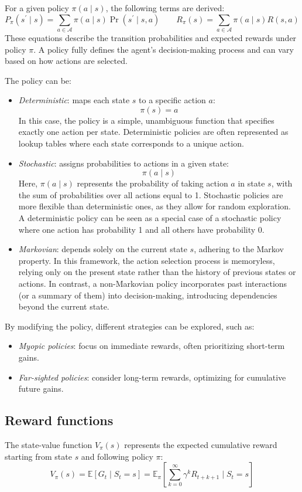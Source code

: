 For a given policy $\pi(a \mid s)$, the following terms are derived:
\[P_\pi(s^\prime\mid s)=\sum_{a\in\mathcal{A}}\pi(a\mid s)\Pr(s^\prime\mid s,a) \qquad R_\pi(s)=\sum_{a\in\mathcal{A}}\pi(a\mid s)R(s,a)\]
These equations describe the transition probabilities and expected rewards under policy $\pi$. 
A policy fully defines the agent's decision-making process and can vary based on how actions are selected.

The policy can be: 
\begin{itemize}
    \item \textit{Deterministic}:  maps each state $s$ to a specific action $a$:
        \[\pi(s)=a\]
        In this case, the policy is a simple, unambiguous function that specifies exactly one action per state. 
        Deterministic policies are often represented as lookup tables where each state corresponds to a unique action.
    \item \textit{Stochastic}: assigns probabilities to actions in a given state:
        \[\pi(a\mid s)\]
        Here, $\pi(a\mid s)$ represents the probability of taking action $a$ in state $s$, with the sum of probabilities over all actions equal to 1.
        Stochastic policies are more flexible than deterministic ones, as they allow for random exploration. 
        A deterministic policy can be seen as a special case of a stochastic policy where one action has probability 1 and all others have probability 0.
    \item \textit{Markovian}: depends solely on the current state $s$, adhering to the Markov property. 
        In this framework, the action selection process is memoryless, relying only on the present state rather than the history of previous states or actions.
        In contrast, a non-Markovian policy incorporates past interactions (or a summary of them) into decision-making, introducing dependencies beyond the current state.
\end{itemize}
\noindent By modifying the policy, different strategies can be explored, such as:
\begin{itemize}
    \item \textit{Myopic policies}: focus on immediate rewards, often prioritizing short-term gains.
    \item \textit{Far-sighted policies}: consider long-term rewards, optimizing for cumulative future gains.
\end{itemize}

\subsection{Reward functions}
The state-value function $V_{\pi}(s)$ represents the expected cumulative reward starting from state $s$ and following policy $\pi$: 
\[V_{\pi}(s) = \mathbb{E}\left[G_t\mid S_t=s\right]=\mathbb{E}_{\pi}\left[\sum_{k=0}^{\infty}\gamma^kR_{t+k+1}\mid S_t=s\right]\]

